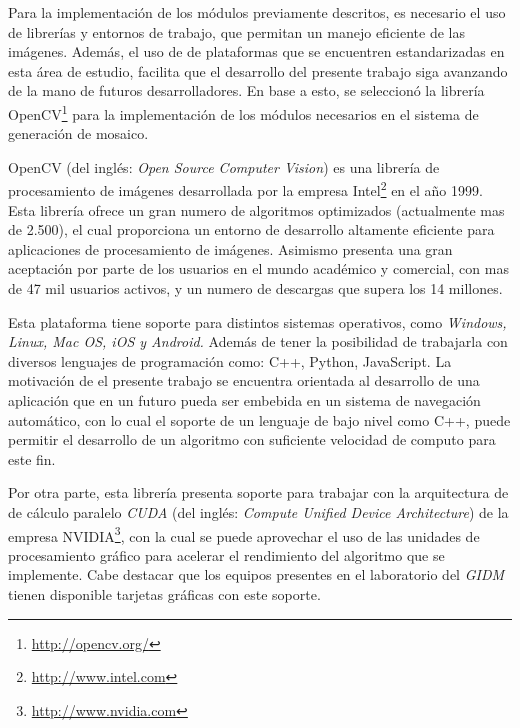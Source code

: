 Para la implementación de los módulos previamente descritos, es necesario el uso de librerías y entornos de trabajo, que permitan un manejo eficiente de las imágenes. Además, el uso de de plataformas que se encuentren estandarizadas en esta área de estudio, facilita que el desarrollo del presente trabajo siga avanzando de la mano de futuros desarrolladores. En base a esto, se seleccionó la librería OpenCV\footnote{\url{http://opencv.org/}} para la implementación de los módulos necesarios en el sistema de generación de mosaico.

OpenCV (del inglés: \textit{Open Source Computer Vision}) es una librería de procesamiento de imágenes desarrollada por la empresa Intel\footnote{\url{http://www.intel.com}} en el año 1999. Esta librería ofrece un gran numero de algoritmos optimizados (actualmente mas de 2.500), el cual proporciona un entorno de desarrollo altamente eficiente para aplicaciones de procesamiento de imágenes. Asimismo presenta una gran aceptación por parte de los usuarios en el mundo académico y comercial, con mas de 47 mil usuarios activos, y un numero de descargas que supera los 14 millones.

Esta plataforma tiene soporte para distintos sistemas operativos, como \textit{Windows, Linux, Mac OS, iOS y Android.} Además de tener la posibilidad de trabajarla con diversos lenguajes de programación como: C++, Python, JavaScript. La motivación de el presente trabajo se encuentra orientada al desarrollo de una aplicación que en un futuro pueda ser embebida en un sistema de navegación automático, con lo cual el soporte de un lenguaje de bajo nivel como C++, puede permitir el desarrollo de un algoritmo con suficiente velocidad de computo para este fin.

Por otra parte, esta librería presenta soporte para trabajar con la arquitectura de de cálculo paralelo \textit{CUDA} (del inglés: \textit{Compute Unified Device Architecture}) de la empresa NVIDIA\footnote{\url{http://www.nvidia.com}}, con la cual se puede aprovechar el uso de las unidades de procesamiento gráfico para acelerar el rendimiento del algoritmo que se implemente. Cabe destacar que los equipos presentes en el laboratorio del \textit{GIDM} tienen disponible tarjetas gráficas con este soporte.

